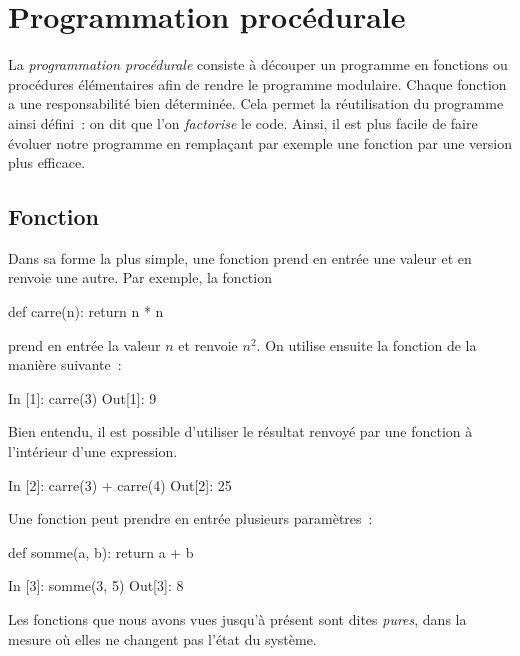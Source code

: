 \documentclass{magnolia}
\begin{document}
\magtoc



\section{Programmation procédurale}

La \emph{programmation procédurale} consiste à découper un programme en fonctions ou
procédures élémentaires afin de rendre le programme modulaire. Chaque fonction a une
responsabilité bien déterminée. Cela permet la réutilisation du programme ainsi défini~:
on dit que l'on \emph{factorise} le code.
Ainsi, il est plus facile de faire évoluer notre programme en
remplaçant par exemple une fonction par une version plus efficace.


\subsection{Fonction}

 Dans sa forme la plus simple, une fonction prend en entrée une valeur et en renvoie une autre. Par exemple, la fonction

\begin{pythoncodeline}
def carre(n):
    return n * n
\end{pythoncodeline}

\noindent prend en entrée la valeur $n$ et renvoie $n^2$. On utilise
ensuite la fonction de la manière suivante~:

\begin{pythoncode}
In [1]: carre(3)
Out[1]: 9
\end{pythoncode}

\noindent Bien entendu, il est possible d'utiliser le résultat renvoyé par une fonction à
l'intérieur d'une expression.

\begin{pythoncode}
In [2]: carre(3) + carre(4)
Out[2]: 25 
\end{pythoncode}

Une fonction peut prendre en entrée plusieurs paramètres~:

\begin{pythoncodeline}
def somme(a, b):
    return a + b
\end{pythoncodeline}

\begin{pythoncode}
In [3]: somme(3, 5)
Out[3]: 8
\end{pythoncode}

\noindent
Les fonctions que nous avons vues jusqu'à présent sont dites \emph{pures}, dans la mesure où elles ne changent pas l'état du système.\\
\end{document}

